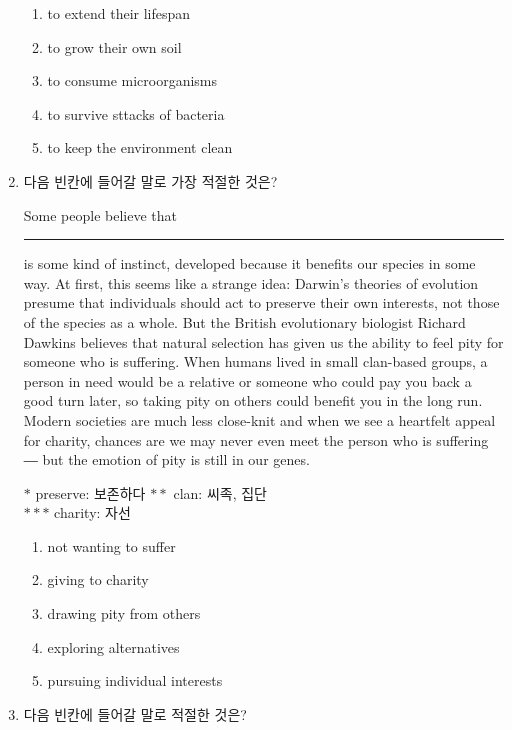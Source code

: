 \documentclass[9pt, a4paper, twocolumn]{oblivoir}
\begin{document}
\begin{enumerate}
    \begin{enumerate}
        \item to extend their lifespan
        \item to grow their own soil %
        \item to consume microorganisms
        \item to survive sttacks of bacteria
        \item to keep the environment clean
    \end{enumerate}
    \pagebreak
        \item 다음 빈칸에 들어갈 말로 가장 적절한 것은?
        
        Some people believe that \rule{2cm}{0.1mm}
is some kind
of instinct, developed because it benefits our species in some
way. At first, this seems like a strange idea: Darwin’s theories
of evolution presume that individuals should act to preserve
their own interests, not those of the species as a whole. But
the British evolutionary biologist Richard Dawkins believes
that natural selection has given us the ability to feel pity for
someone who is suffering. When humans lived in small
clan-based groups, a person in need would be a relative or
someone who could pay you back a good turn later, so taking
pity on others could benefit you in the long run. Modern
societies are much less close-knit and when we see a heartfelt
appeal for charity, chances are we may never even meet the
person who is suffering ― but the emotion of pity is still in
our genes.
\begin{flushright}
    {\small $*$ preserve: 보존하다 $**$ clan: 씨족, 집단 \\ $***$ charity: 자선}
\end{flushright}
\begin{enumerate}
    \item not wanting to suffer 
    \item giving to charity %
    \item drawing pity from others 
    \item exploring alternatives
    \item pursuing individual interests 
\end{enumerate}

\pagebreak

    \item 다음 빈칸에 들어갈 말로 적절한 것은?


\end{enumerate}
\end{document}
